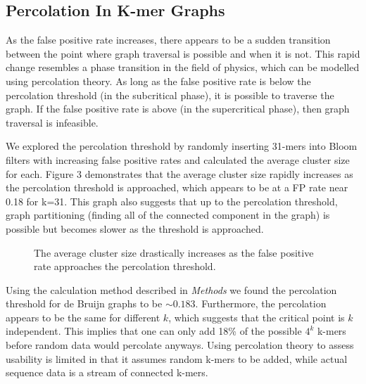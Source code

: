 \documentclass[12pt]{article} \usepackage{simplemargins}
\begin{document}
\subsection{Percolation In K-mer Graphs}
As the false positive rate increases, there appears to be a sudden
transition between the point where graph traversal is possible and
when it is not. This rapid change resembles a phase transition in the
field of physics, which can be modelled using percolation theory. As
long as the false positive rate is below the percolation threshold (in
the subcritical phase), it is possible to traverse the graph. If the
false positive rate is above (in the supercritical phase), then graph
traversal is infeasible. 

We explored the percolation threshold by randomly inserting 31-mers into Bloom
filters with increasing false positive rates and calculated the average
cluster size for each. Figure 3 demonstrates that the average cluster
size rapidly increases as the percolation threshold is approached,
which appears to be at a FP rate near 0.18 for k=31. This
graph also suggests that up to the percolation threshold, graph
partitioning (finding all of the connected component in the graph) 
is possible but becomes slower as the threshold is
approached.

\begin{figure}
\caption{The average cluster size drastically increases as the false positive 
rate approaches the percolation threshold.}
\end{figure}

Using the calculation method described in \emph{Methods} we found the 
percolation threshold for de Bruijn graphs to be $\sim0.183$. 
Furthermore, the percolation appears to be the same for 
different $k$, which suggests that the 
critical point is $k$ independent.
This implies that one can only add 18\% of the possible $4^k$ k-mers
before random data would percolate anyways. Using percolation theory to 
assess usability is limited in that it assumes
random k-mers to be added, while actual sequence data is a stream of
connected k-mers.
\end{document}
